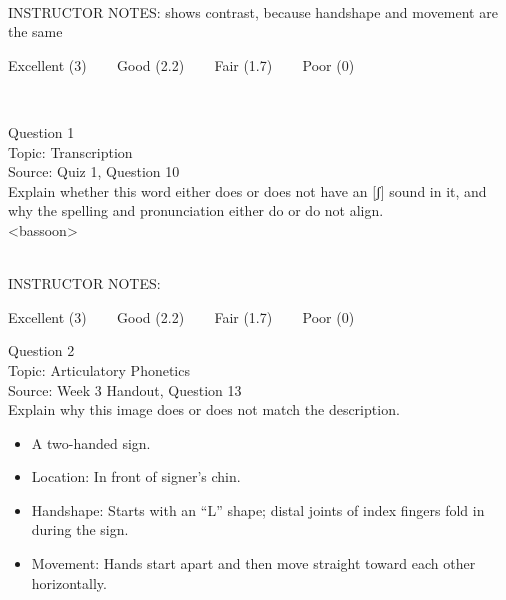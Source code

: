 \documentclass[12pt]{article}
\begin{document}
~\\
INSTRUCTOR NOTES: shows contrast, because handshape and movement are the same


\vfill
Excellent (3) ~~~ Good (2.2) ~~~ Fair (1.7) ~~~ Poor (0)
\newpage

\begin{center}
\textbf{{\color{red}{\HUGE END OF EXAM}}}\\

\end{center}
\newpage

\begin{center}
\textbf{{\color{blue}{\HUGE START OF EXAM\\}}}

\textbf{{\color{blue}{\HUGE Student ID: 54125\\}}}

\textbf{{\color{blue}{\HUGE \\}}}

\end{center}
\newpage

{\large Question 1}\\

Topic: Transcription\\
Source: Quiz 1, Question 10\\

Explain whether this word either does or does not have an [ʃ] sound in it, and why the spelling and pronunciation either do or do not align.\\

<bassoon>


~\\
INSTRUCTOR NOTES: 


\vfill
Excellent (3) ~~~ Good (2.2) ~~~ Fair (1.7) ~~~ Poor (0)
\newpage

{\large Question 2}\\

Topic: Articulatory Phonetics\\
Source: Week 3 Handout, Question 13\\

Explain why this image does or does not match the description.\\

\begin{itemize} \item A two-handed sign. \item Location: In front of signer’s chin. \item Handshape: Starts with an “L” shape; distal joints of index fingers fold in during the sign. \item Movement: Hands start apart and then move straight toward each other horizontally. \end{itemize}
\end{document}

